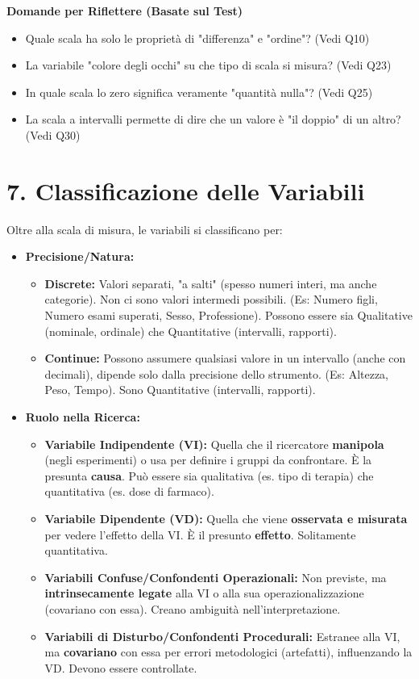 \documentclass[12pt, a4paper]{article}
\newenvironment{reflectionbox}{%
    \begin{framed}\par\medskip\noindent
    \textbf{\color{boxtitlecolor}Domande per Riflettere (Basate sul Test)} \par
    \begin{itemize}[leftmargin=*, label=$\blacktriangleright$]
}{%
    \end{itemize}\par\medskip
    \end{framed}
}
\begin{document}
\begin{reflectionbox}
    \item Quale scala ha solo le proprietà di "differenza" e "ordine"? (Vedi Q10)
    \item La variabile "colore degli occhi" su che tipo di scala si misura? (Vedi Q23)
    \item In quale scala lo zero significa veramente "quantità nulla"? (Vedi Q25)
    \item La scala a intervalli permette di dire che un valore è "il doppio" di un altro? (Vedi Q30)
\end{reflectionbox}

\section*{7. Classificazione delle Variabili}
Oltre alla scala di misura, le variabili si classificano per:
\begin{itemize}
    \item \textbf{Precisione/Natura:}
        \begin{itemize}
            \item \textbf{Discrete:} Valori separati, "a salti" (spesso numeri interi, ma anche categorie). Non ci sono valori intermedi possibili. (Es: Numero figli, Numero esami superati, Sesso, Professione). Possono essere sia Qualitative (nominale, ordinale) che Quantitative (intervalli, rapporti).
            \item \textbf{Continue:} Possono assumere qualsiasi valore in un intervallo (anche con decimali), dipende solo dalla precisione dello strumento. (Es: Altezza, Peso, Tempo). Sono Quantitative (intervalli, rapporti).
        \end{itemize}
    \item \textbf{Ruolo nella Ricerca:}
        \begin{itemize}
            \item \textbf{Variabile Indipendente (VI):} Quella che il ricercatore \textbf{manipola} (negli esperimenti) o usa per definire i gruppi da confrontare. È la presunta \textbf{causa}. Può essere sia qualitativa (es. tipo di terapia) che quantitativa (es. dose di farmaco).
            \item \textbf{Variabile Dipendente (VD):} Quella che viene \textbf{osservata e misurata} per vedere l'effetto della VI. È il presunto \textbf{effetto}. Solitamente quantitativa.
            \item \textbf{Variabili Confuse/Confondenti Operazionali:} Non previste, ma \textbf{intrinsecamente legate} alla VI o alla sua operazionalizzazione (covariano con essa). Creano ambiguità nell'interpretazione.
            \item \textbf{Variabili di Disturbo/Confondenti Procedurali:} Estranee alla VI, ma \textbf{covariano} con essa per errori metodologici (artefatti), influenzando la VD. Devono essere controllate.
        \end{itemize}
\end{itemize}
\end{document}
